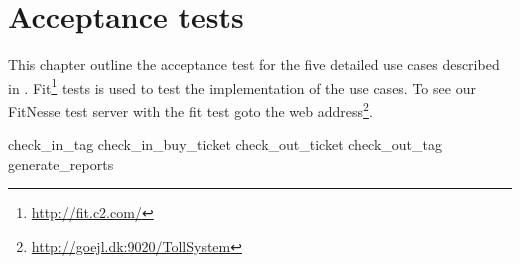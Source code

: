 \chapter{Acceptance tests}
This chapter outline the acceptance test for the five detailed use cases described in . Fit\footnote{\url{http://fit.c2.com/}} tests is used to test the implementation of the use cases. To see our FitNesse test server with the fit test goto the web address\footnote{\url{http://goejl.dk:9020/TollSystem}}.
\newline

{check_in_tag}
\nobreak
{check_in_buy_ticket}
\nobreak
{check_out_ticket}
\nobreak
{check_out_tag}
\nobreak
{generate_reports}
\nobreak